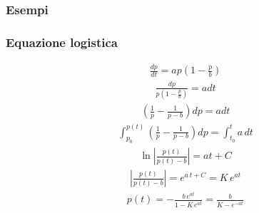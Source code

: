 \documentclass[letterpaper,10pt,italian]{jupyterBook}
\begin{document}
\subsubsection{Esempi}
\label{\detokenize{ch/ode:ode-hs-types-separable-ex}}\label{\detokenize{ch/ode:id1}}\subsubsection*{Equazione logistica}
\begin{equation*}
\begin{split}\frac{d p}{d t} =  a p \left( 1 - \frac{p}{b} \right)\end{split}
\end{equation*}\begin{equation*}
\begin{split}\frac{d p}{p \left(1 - \frac{p}{b}\right)} = a dt\end{split}
\end{equation*}\begin{equation*}
\begin{split}\left( \frac{1}{p} - \frac{1}{p - b} \right) dp = a dt\end{split}
\end{equation*}\begin{equation*}
\begin{split}\int_{p_0}^{p(t)} \left( \frac{1}{p} - \frac{1}{p - b} \right) dp = \int_{t_0}^{t} a \, dt\end{split}
\end{equation*}\begin{equation*}
\begin{split}\ln \left|\frac{p(t)}{p(t)-b}\right| = a t + C\end{split}
\end{equation*}\begin{equation*}
\begin{split}\left|\frac{p(t)}{p(t)-b}\right| = e^{a \, t + C} = K \, e^{a t}\end{split}
\end{equation*}\begin{equation*}
\begin{split}p(t) = - \frac{b \, e^{at}}{1 - K \, e^{a t}} = \frac{b}{K - e^{-at}} \end{split}
\end{equation*}
\end{document}
